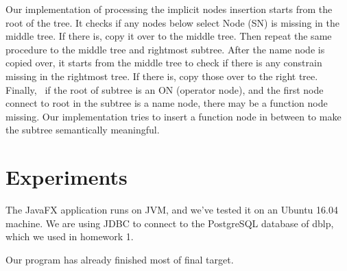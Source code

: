 \documentclass[twocolumn]{article}
\begin{document}
Our implementation of processing the implicit nodes insertion starts from the root of the tree. It checks if any nodes below select Node (SN) is missing in the middle tree. If there is, copy it over to the middle tree. Then repeat the same procedure to the middle tree and rightmost subtree. After the name node is copied over, it starts from the middle tree to check if there is any constrain missing in the rightmost tree. If there is, copy those over to the right tree. Finally,  if the root of subtree is an ON (operator node), and the first node connect to root in the subtree is a name node, there may be a function node missing. Our implementation tries to insert a function node in between to make the subtree semantically meaningful. 

\section{Experiments}
The JavaFX application runs on JVM, and we’ve tested it on an Ubuntu 16.04 machine. We are using JDBC to connect to the PostgreSQL database of dblp, which we used in homework 1.

Our program has already finished most of final target. 
\end{document}
